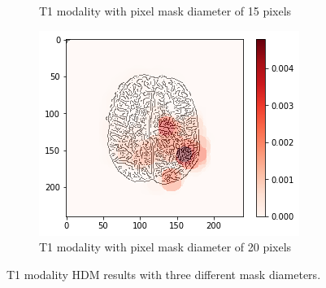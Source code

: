 \begin{figure}[H]
\begin{subfigure}{.32\textwidth}
        \caption{T1 modality with pixel mask diameter of 15 pixels}
    \end{subfigure}\hfill%
    \begin{subfigure}{.32\textwidth}
        \centering
        \includegraphics[width=\linewidth]{chapters/06_hdm/circle20/3.png}
        \caption{T1 modality with pixel mask diameter of 20 pixels}
    \end{subfigure}
    \caption{T1 modality HDM results with three different mask diameters.}
    \label{hdm_circle_size_t1}
\end{figure}

